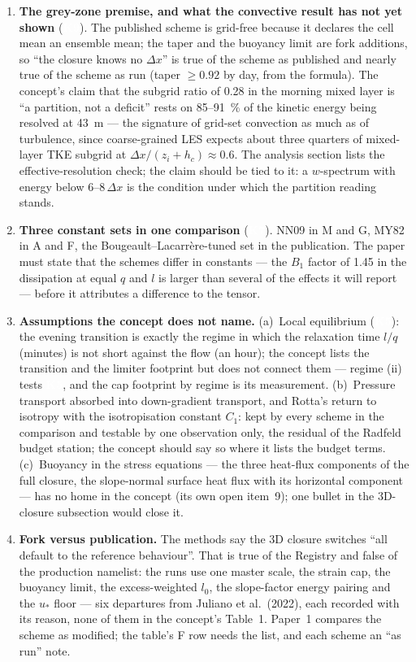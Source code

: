 \documentclass[10pt,a4paper]{article}
\newcommand{\keytag}[1]{\colorbox{keyc}{\textcolor{white}{\sffamily\bfseries\scriptsize K#1}}}
\begin{document}
\begin{enumerate}
\item \textbf{The grey-zone premise, and what the convective result has not yet shown} (\keytag{9}). The published scheme is grid-free because it declares the cell mean an ensemble mean; the taper and the buoyancy limit are fork additions, so ``the closure knows no $\Delta x$'' is true of the scheme as published and nearly true of the scheme as run (taper $\ge 0.92$ by day, from the formula). The concept's claim that the subgrid ratio of 0.28 in the morning mixed layer is ``a partition, not a deficit'' rests on 85--91~\% of the kinetic energy being resolved at 43~m — the signature of grid-set convection as much as of turbulence, since coarse-grained LES expects about three quarters of mixed-layer TKE subgrid at $\Delta x/(z_i + h_c) \approx 0.6$. The analysis section lists the effective-resolution check; the claim should be tied to it: a $w$-spectrum with energy below $6$--$8\,\Delta x$ is the condition under which the partition reading stands.

\item \textbf{Three constant sets in one comparison} (\keytag{7}). NN09 in M and G, MY82 in A and F, the Bougeault--Lacarrère-tuned set in the publication. The paper must state that the schemes differ in constants — the $B_1$ factor of 1.45 in the dissipation at equal $q$ and $l$ is larger than several of the effects it will report — before it attributes a difference to the tensor.

\item \textbf{Assumptions the concept does not name.} (a)~Local equilibrium (\keytag{5}): the evening transition is exactly the regime in which the relaxation time $l/q$ (minutes) is not short against the flow (an hour); the concept lists the transition and the limiter footprint but does not connect them — regime (ii) tests \keytag{5}, and the cap footprint by regime is its measurement. (b)~Pressure transport absorbed into down-gradient transport, and Rotta's return to isotropy with the isotropisation constant $C_1$: kept by every scheme in the comparison and testable by one observation only, the residual of the Radfeld budget station; the concept should say so where it lists the budget terms. (c)~Buoyancy in the stress equations — the three heat-flux components of the full closure, the slope-normal surface heat flux with its horizontal component — has no home in the concept (its own open item~9); one bullet in the 3D-closure subsection would close it.

\item \textbf{Fork versus publication.} The methods say the 3D closure switches ``all default to the reference behaviour''. That is true of the Registry and false of the production namelist: the runs use one master scale, the strain cap, the buoyancy limit, the excess-weighted $l_0$, the slope-factor energy pairing and the $u_*$ floor — six departures from Juliano et al.\ (2022), each recorded with its reason, none of them in the concept's Table~1. Paper~1 compares the scheme as modified; the table's F row needs the list, and each scheme an ``as run'' note.
\end{enumerate}
\end{document}
